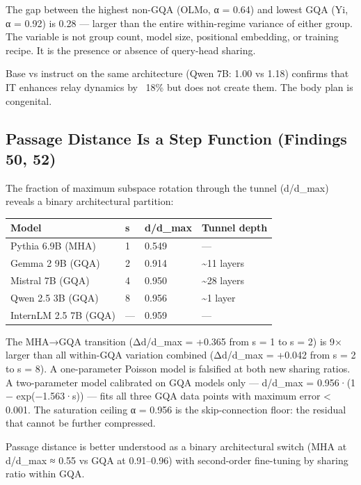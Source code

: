 \documentclass[12pt]{article}
\begin{document}
The gap between the highest non-GQA (OLMo, α = 0.64) and lowest GQA (Yi, α = 0.92) is 0.28 — larger than the entire within-regime variance of either group. The variable is not group count, model size, positional embedding, or training recipe. It is the presence or absence of query-head sharing.

Base vs instruct on the same architecture (Qwen 7B: 1.00 vs 1.18) confirms that IT enhances relay dynamics by ~18\% but does not create them. The body plan is congenital.

\subsection{Passage Distance Is a Step Function (Findings 50, 52)}

The fraction of maximum subspace rotation through the tunnel (d/d\_max) reveals a binary architectural partition:

\begin{table}[h]
\centering
\small
\begin{tabular}{llll}
\toprule
\textbf{Model} & \textbf{s} & \textbf{d/d_max} & \textbf{Tunnel depth} \\
\midrule
Pythia 6.9B (MHA) & 1 & 0.549 & — \\
Gemma 2 9B (GQA) & 2 & 0.914 & \textasciitilde{}11 layers \\
Mistral 7B (GQA) & 4 & 0.950 & \textasciitilde{}28 layers \\
Qwen 2.5 3B (GQA) & 8 & 0.956 & \textasciitilde{}1 layer \\
InternLM 2.5 7B (GQA) & — & 0.959 & — \\
\bottomrule
\end{tabular}
\end{table}


The MHA→GQA transition (Δd/d\_max = +0.365 from s = 1 to s = 2) is 9× larger than all within-GQA variation combined (Δd/d\_max = +0.042 from s = 2 to s = 8). A one-parameter Poisson model is falsified at both new sharing ratios. A two-parameter model calibrated on GQA models only — d/d\_max = 0.956·(1 − exp(−1.563·s)) — fits all three GQA data points with maximum error < 0.001. The saturation ceiling α = 0.956 is the skip-connection floor: the residual that cannot be further compressed.

Passage distance is better understood as a binary architectural switch (MHA at d/d\_max ≈ 0.55 vs GQA at 0.91–0.96) with second-order fine-tuning by sharing ratio within GQA.
\end{document}
